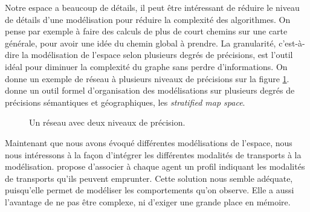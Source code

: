 \documentclass[a4paper]{article}
\begin{document}
Notre espace a beaucoup de détails, il peut être intéressant de réduire le
niveau de détails d'une modélisation pour réduire la complexité des algorithmes.
On pense par exemple à faire des calculs de plus de court chemins sur une carte
générale, pour avoir une idée du chemin global à prendre. La granularité,
c'est-à-dire la modélisation de l'espace selon plusieurs degrés de précisions,
est l'outil idéal pour diminuer la complexité du graphe sans perdre
d'informations. On donne un exemple de réseau à plusieurs niveaux de précisions
sur la figure \ref{fig:generalisation}. \cite{stell1998} donne un outil formel
d'organisation des modélisations sur plusieurs degrés de précisions sémantiques
et géographiques, les \emph{stratified map space}.

\begin{figure}
  \caption{Un réseau avec deux niveaux de précision.}
  \label{fig:generalisation}
\end{figure}

Maintenant que nous avons évoqué différentes modélisations de l'espace, nous
nous intéressons à la façon d'intégrer les différentes modalités de transports à
la modélisation. \cite{jguirim2015} propose d'associer à chaque agent un profil
indiquant les modalités de transports qu'ils peuvent emprunter. Cette solution
nous semble adéquate, puisqu'elle permet de modéliser les comportements qu'on
observe. Elle a aussi l'avantage de ne pas être complexe, ni d'exiger une grande
place en mémoire.
\end{document}
